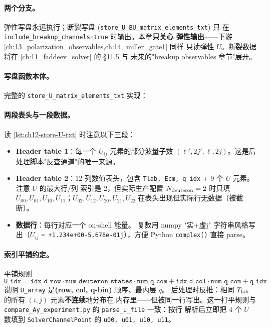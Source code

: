 \paragraph{两个分支。}
弹性写盘永远执行；断裂写盘 (\texttt{store\_U\_BU\_matrix\_elements\_txt}) 只
在 \texttt{include\_breakup\_channels=true} 时输出。本章\textbf{只关心
弹性输出}——下游 \cref{ch:13_polarization_observables,ch:14_miller_gate1} 同样
只读弹性 \(U\)。断裂数据将在 \cref{ch:11_faddeev_solver} 的 §11.5 与
未来的"breakup observables 章节"展开。

\paragraph{写盘函数本体。}
完整的 \texttt{store\_U\_matrix\_elements\_txt} 实现：



\paragraph{两段表头与一段数据。}
读 \cref{lst:ch12-store-U-txt} 时注意以下三段：
\begin{itemize}
  \item \textbf{Header table 1}：每一个 \(U_{ij}\) 元素的部分波量子数
        \((\ell', 2j', \ell, 2j)\)。这是后处理脚本"反查通道"的唯一来源。
  \item \textbf{Header table 2}：12 列数值表头，包含
        \texttt{Tlab, Ecm, q\_idx} + 9 个 \(U\) 元素。注意 \(U\) 的最大行/列
        索引是 2，但实际生产配置 \(N_{\rm deuteron} = 2\) 时只填 \(U_{00},
        U_{01}, U_{10}, U_{11}\)；\(U_{02}, U_{12}, U_{20}, U_{21}, U_{22}\)
        在表头出现但实际行无数据（被截断）。
  \item \textbf{数据行}：每行对应一个 on-shell 能量。
        复数用 numpy "实+虚j" 字符串风格写出（\(U_{ij}\)
        \texttt{= +1.234e+00-5.678e-01j}），方便 Python \texttt{complex()} 直接 parse。
\end{itemize}

\paragraph{索引平铺约定。}
平铺规则
\begin{equation*}
\mathtt{U\_idx} = \mathtt{idx\_d\_row} \cdot \mathtt{num\_deuteron\_states} \cdot \mathtt{num\_q\_com}
       + \mathtt{idx\_d\_col} \cdot \mathtt{num\_q\_com}
       + \mathtt{q\_idx}
\end{equation*}
说明 \texttt{U\_array} 是\textbf{(row, col, q-bin)} 顺序、最内层 \(q\)。
后处理时反推：相同 \({T_{\text{lab}}}\) 的所有 \((i,j)\) 元素\textbf{不连续}地分布在
内存里——但被同一行写出。这一打平规则与
\texttt{compare\_Ay\_experiment.py} 的 \texttt{parse\_u\_file} 一致：按行
解析后立即把 4 个 \(U\) 数填到 \texttt{SolverChannelPoint} 的 \texttt{u00,
u01, u10, u11}。

